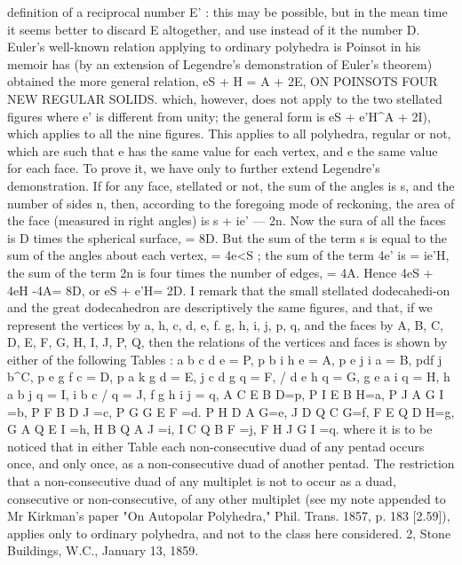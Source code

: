 \documentclass[11pt,a4paper]{book}
\begin{document}
definition  of  a  reciprocal  number  E' :  this  may  be  possible,  but  in  the  mean  time  it
seems  better  to  discard  E  altogether,  and  use  instead  of  it  the  number  D.
Euler's  well-known  relation  applying  to  ordinary  polyhedra  is
Poinsot  in  his  memoir   has   (by  an  extension  of  Legendre's   demonstration  of  Euler's
theorem)  obtained  the  more  general  relation,
eS  +  H  =  A  +  2E,
ON    POINSOTS    FOUR   NEW    REGULAR   SOLIDS.
which,  however,  does  not  apply  to  the  two  stellated  figures  where  e'  is  different  from
unity;  the  general  form  is
eS  +  e'H^A  +  2I),
which  applies  to  all  the  nine  figures.  This  applies  to  all  polyhedra,  regular  or  not,
which  are  such  that  e  has  the  same  value  for  each  vertex,  and  e  the  same  value
for  each  face.  To  prove  it,  we  have  only  to  further  extend  Legendre's  demonstration.
If  for  any  face,  stellated  or  not,  the  sum  of  the  angles  is  s,  and  the  number  of  sides
n,  then,  according  to  the  foregoing  mode  of  reckoning,  the  area  of  the  face  (measured
in  right  angles)  is
s  +  ie'  —  2n.
Now  the  sura  of  all  the  faces  is  D  times  the  spherical  surface,  =  8D.  But  the  sum
of  the  term  s  is  equal  to  the  sum  of  the  angles  about  each  vertex,  =  4e<S ;  the  sum
of  the  term  4e'  is  =  ie'H,  the  sum  of  the  term  2n  is  four  times  the  number  of
edges,  =  4A.     Hence  4eS  +  4eH  -4A=  8D,  or  eS  +  e'H=  2D.
I  remark  that  the  small  stellated  dodecahedi-on  and  the  great  dodecahedron  are
descriptively  the  same  figures,  and  that,  if  we  represent  the  vertices  by  a,  h,  c,  d,  e,
f.  g,  h,  i,  j,  p,  q,  and  the  faces  by  A,  B,  C,  D,  E,  F,  G,  H,  I,  J,  P,  Q,  then  the
relations  of  the  vertices  and  faces  is  shown  by  either  of  the  following  Tables :
a  b  c  d  e  =  P,
p  b  i  h  e  =  A,
p  e  j  i  a  =  B,
pdf  j  b^C,
p  e  g  f  c  =  D,
p  a  k  g  d  =  E,
j  c  d  g  q  =  F,
/  d  e  h  q  =  G,
g  e  a  i  q  =  H,
h  a  b  j  q  =  I,
i  b  c  /  q  =  J,
f  g  h  i  j  =  q,
A  C  E  B  D=p,
P  I  E  B  H=a,
P  J  A  G  I  =b,
P  F  B  D  J  =c,
P  G  G  E  F  =d.
P  H  D  A  G=e,
J  D  Q  C  G=f,
F  E  Q  D  H=g,
G  A  Q  E  I  =h,
H  B  Q  A  J  =i,
I  C  Q  B  F  =j,
F  H  J  G   I  =q.
where  it  is  to  be  noticed  that  in  either  Table  each  non-consecutive  duad  of  any
pentad  occurs  once,  and  only  once,  as  a  non-consecutive  duad  of  another  pentad.  The
restriction  that  a  non-consecutive  duad  of  any  multiplet  is  not  to  occur  as  a  duad,
consecutive  or  non-consecutive,  of  any  other  multiplet  (see  my  note  appended  to
Mr  Kirkman's  paper  "On  Autopolar  Polyhedra,"  Phil.  Trans.  1857,  p.  183  [2.59]),  applies
only  to  ordinary  polyhedra,  and  not  to  the  class  here  considered.
2,  Stone  Buildings,   W.C.,  January  13,  1859.
\end{document}
